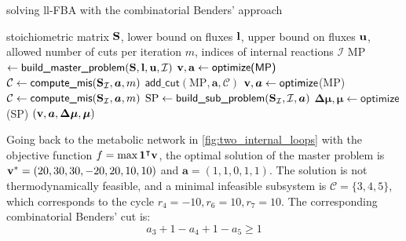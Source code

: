 \begin{algorithm}
    \caption{solving ll-FBA with the combinatorial Benders' approach}\label{alg:CB}
    \begin{algorithmic}[1]
        \Require stoichiometric matrix $\bold S$, lower bound on fluxes $\bold l$, upper bound on fluxes $\bold u$, allowed number of cuts per iteration $m$, indices of internal reactions $\mathcal{I}$
        \State MP $\gets \textsf{build\_master\_problem}(\bold S, \bold l, \bold u, \mathcal{I})$
        \State $\bold{v, a} \gets \textsf{optimize(MP)}$ 
        \State $\mathcal{C} \gets \textsf{compute\_mis}(\bold S_\mathcal{I}, \boldsymbol a, m)$ 
            \State $\textsf{add\_cut}(\text{MP}, \boldsymbol a, \mathcal{C})$ 
            \State $\bold v, \boldsymbol a \gets \textsf{optimize}$(MP)
            \State $\mathcal{C} \gets \textsf{compute\_mis}(\bold S_\mathcal{I}, \boldsymbol a, m)$
        \EndWhile
        \State $\text{SP} \gets \textsf{build\_sub\_problem}(\bold S_\mathcal{I}, \mathcal{I}, \boldsymbol a)$
        \State $\boldsymbol{\Delta \mu}, \boldsymbol \mu \gets \textsf{optimize}$(SP)
    \State \Return $(\bold v, \boldsymbol a, \boldsymbol{\Delta \mu}, \boldsymbol \mu)$ 
    \end{algorithmic}
\end{algorithm}

Going back to the metabolic network in \cref{fig:two_internal_loops}
with the objective function $f = \text{max} \, \bold 1^\intercal \bold v$, the optimal solution of the master problem is $\bold v^* = (20, 30, 30, -20, 20, 10, 10)$ and $\boldsymbol a = (1,1,0,1,1)$. 
The solution is not thermodynamically feasible, and a minimal infeasible subsystem is $\mathcal{C} = \{3, 4, 5\}$, which corresponds to the cycle $r_4=-10, r_6=10, r_7=10$. 
The corresponding combinatorial Benders' cut is:
\begin{equation*}
    a_3 + 1 - a_4 + 1 - a_5 \geq 1
\end{equation*}

